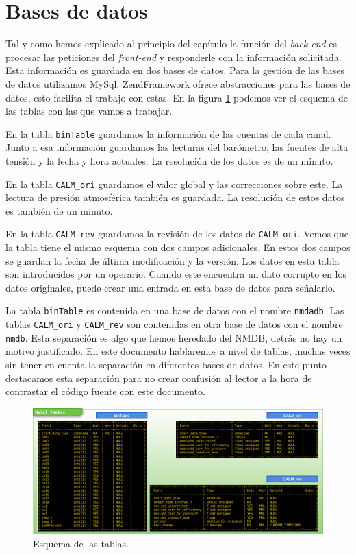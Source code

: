 \section{Bases de datos}
	Tal y como hemos explicado al principio del capítulo la función del \emph{back-end} es  procesar las peticiones del \emph{front-end} y
	responderle con la información solicitada. Esta información es guardada en dos bases de datos. Para la gestión de las bases de datos
	utilizamos MySql\cite{MySql}. ZendFramework ofrece abstracciones para las bases de datos, esto facilita el trabajo con estas. En la figura
	\ref{fig:tablas} podemos ver el esquema de las tablas con las que vamos a trabajar.
	\par
	En la tabla \texttt{binTable} guardamos la información de las cuentas de cada canal. Junto a esa información guardamos las lecturas del
	barómetro, las fuentes de alta tensión y la fecha y hora actuales. La resolución de los datos es de un minuto.
	\par
	En la tabla \texttt{CALM\_ori} guardamos el valor global y las correcciones sobre este. La lectura de presión atmosférica también es guardada.
	La resolución de estos datos es también de un minuto.
	\par
	En la tabla \texttt{CALM\_rev} guardamos la revisión de los datos de \texttt{CALM\_ori}. Vemos que la tabla tiene el mismo esquema con dos
	campos adicionales. En estos dos campos se guardan la fecha de última modificación y la versión. Los datos en esta tabla son introducidos por
	un operario. Cuando este encuentra un dato corrupto en los datos originales, puede crear una entrada en esta base de datos para señalarlo.
	\par
	La tabla \texttt{binTable} es contenida en una base de datos con el nombre \texttt{nmdadb}. Las tablas \texttt{CALM\_ori} y \texttt{CALM\_rev}
	son contenidas en otra base de datos con el nombre \texttt{nmdb}. Esta separación es algo que hemos heredado del NMDB, detrás no hay un motivo
	justificado. En este documento hablaremos a nivel de tablas, muchas veces sin tener en cuenta la separación en diferentes bases de datos. En
	este punto destacamos esta separación para no crear confusión al lector a la hora de contrastar el código fuente con este documento. 
	\begin{figure}[h]
		\centering
		\includegraphics[keepaspectratio, width=1\textwidth]{./img/tablas.png}
		\caption{Esquema de las tablas.}
		\label{fig:tablas}
	\end{figure}
